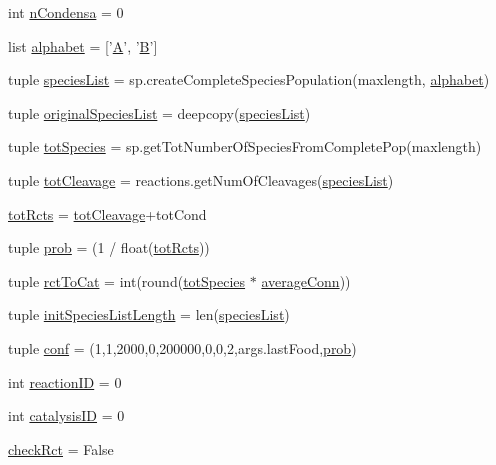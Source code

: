 \begin{DoxyCompactItemize}
int \hyperlink{a00157_a38aa665f11207bbd8cd2da4c382d4aca}{n\-Condensa} = 0
\item 
list \hyperlink{a00157_ab0d9c13eee214bf78b20760bf2835248}{alphabet} = \mbox{[}'\hyperlink{a00111_ab4f8a2431d9ad6efec44b47971737c52}{A}', '\hyperlink{a00111_afb39b9efa52a33745c5e622fa358a97f}{B}'\mbox{]}
\item 
tuple \hyperlink{a00157_a5bfc4cfa78ac777159cb0ca9c9c5c2f6}{species\-List} = sp.\-create\-Complete\-Species\-Population(maxlength, \hyperlink{a00157_ab0d9c13eee214bf78b20760bf2835248}{alphabet})
\item 
tuple \hyperlink{a00157_a62b034cfe14eff36f09dd65a51ae7c9c}{original\-Species\-List} = deepcopy(\hyperlink{a00157_a5bfc4cfa78ac777159cb0ca9c9c5c2f6}{species\-List})
\item 
tuple \hyperlink{a00157_ac657414359bc072005d43b2328119a7d}{tot\-Species} = sp.\-get\-Tot\-Number\-Of\-Species\-From\-Complete\-Pop(maxlength)
\item 
tuple \hyperlink{a00157_a1e875e49e1f980d461a398fd6a072b0b}{tot\-Cleavage} = reactions.\-get\-Num\-Of\-Cleavages(\hyperlink{a00157_a5bfc4cfa78ac777159cb0ca9c9c5c2f6}{species\-List})
\item 
\hyperlink{a00157_a059c41eb160321f87ba469fddd20eda7}{tot\-Rcts} = \hyperlink{a00157_a1e875e49e1f980d461a398fd6a072b0b}{tot\-Cleavage}+tot\-Cond
\item 
tuple \hyperlink{a00157_aad2c05e3d2146196ed236911dd796f6e}{prob} = (1 / float(\hyperlink{a00157_a059c41eb160321f87ba469fddd20eda7}{tot\-Rcts}))
\item 
tuple \hyperlink{a00157_afa804d4b1d39a63de9f14e5ab379ae34}{rct\-To\-Cat} = int(round(\hyperlink{a00157_ac657414359bc072005d43b2328119a7d}{tot\-Species} $\ast$ \hyperlink{a00157_a0d59133b2bb42e7aa26a3dba3a2a9a70}{average\-Conn}))
\item 
tuple \hyperlink{a00157_af2370a811b14632a793a28e451be8150}{init\-Species\-List\-Length} = len(\hyperlink{a00157_a5bfc4cfa78ac777159cb0ca9c9c5c2f6}{species\-List})
\item 
tuple \hyperlink{a00157_aa468c4ff92202c7d89fb631e8cb54dc8}{conf} = (1,1,2000,0,200000,0,0,2,args.\-last\-Food,\hyperlink{a00157_aad2c05e3d2146196ed236911dd796f6e}{prob})
\item 
int \hyperlink{a00157_a07d632b487fabd051ab725ee95a85368}{reaction\-I\-D} = 0
\item 
int \hyperlink{a00157_a35953bf84aa0f7a2a3ffa3f68190c0fa}{catalysis\-I\-D} = 0
\item 
\hyperlink{a00157_a6f49caf3b9250cab918ae8dc5aef9931}{check\-Rct} = False

\end{DoxyCompactItemize}
